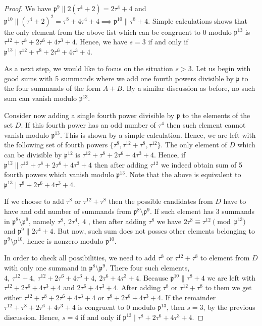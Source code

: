 \documentclass[12pt]{article}
\theoremstyle{remark}
\newcommand{\p}{\mathfrak{p}}
\begin{document}
\begin{proof}
We have $\mathfrak{p}^9 \parallel 2(\tau^4+2) = 2\tau^4+4$ and $\mathfrak{p}^{10} \parallel (\tau^4+2)^2 = \tau^8 + 4\tau^4 + 4 \implies \mathfrak{p}^{10} \parallel \tau^8+4 $. Simple calculations shows that the only element from the above list which can be congruent to 0 modulo $\mathfrak{p}^{13}$ is $\tau^{12}+\tau^8+2\tau^6+4\tau^3+4$. Hence, we have $s=3$ if and only if $\mathfrak{p}^{13} \mid \tau^{12}+\tau^8+2\tau^6+4\tau^3+4 $.

As a next step, we would like to focus on the situation $s>3$. Let us begin with good sums with 5 summands where we add one fourth powers divisible by $\mathfrak{p}$ to the four summands of the form $A+B$. By a similar discussion as before, no such sum can vanish modulo $\mathfrak{p}^{13}$.






 Consider now adding a single fourth power divisible by $\p$ to the elements of the set $D$. If this fourth power has an odd number of $\tau^4$ then such element cannot vanish modulo $\p^{13}$. This is shown by a simple calculation. Hence, we are left with the following set of fourth powers $\{\tau^8, \tau^{12}+\tau^8, \tau^{12}\}$. The only element of $D$ which can be divisible by $\p^{12}$ is $\tau^{12}+\tau^8+2\tau^6+4\tau^3+4$. Hence, if $\mathfrak{p}^{12} \parallel \tau^{12}+\tau^8+2\tau^6+4\tau^3+4$ then after adding $\tau^{12}$ we indeed obtain sum of 5 fourth powers which vanish modulo $\p^{13}$. Note that the above is equivalent to $\mathfrak{p}^{13} \mid \tau^8+2\tau^6+4\tau^3+4$.

 If we choose to add $\tau^8$ or $ \tau^{12}+\tau^8$ then the possible candidates from $D$ have to have and odd number of summands from $\p^8\setminus \p^9$. If such element has 3 summands in $\p^8\setminus \p^9$, namely $\tau^8, \ 2\tau^4, \ 4$ , then after adding $\tau^8$ we have $2\tau^8 \equiv \tau^{12} \pmod{\mathfrak{p}^{13}}$ and $\mathfrak{p}^9 \parallel 2\tau^4+4$. But now, such sum does not posses other elements belonging to $\p^9\setminus \p^{10}$, hence is nonzero modulo $\p^{10}$.

In order to check all possibilities, we need to add $\tau^8$ or $ \tau^{12}+\tau^8$ to element from $D$ with only one summand in $\p^8\setminus \p^9$. There four such elements, $4,\  \tau^{12}+4,\ \tau^{12}+2\tau^6+4\tau^3+4,\  2\tau^6+4\tau^3+4$. Because $\mathfrak{p}^{10} \parallel \tau^8+4$ we are left with $\tau^{12}+2\tau^6+4\tau^3+4$ and $2\tau^6+4\tau^3+4$. After adding $\tau^8$ or $\tau^{12}+\tau^8$  to them we get either $\tau^{12}+\tau^8+2\tau^6+4\tau^3+4$ or $\tau^8+2\tau^6+4\tau^3+4$. If the remainder $\tau^{12}+\tau^8+2\tau^6+4\tau^3+4$ is congruent to 0 modulo $\mathfrak{p}^{13}$, then $s=3$, by the previous discussion. Hence, $s=4$ if and only if $\mathfrak{p}^{13} \mid \tau^8+2\tau^6+4\tau^3+4 $.


\end{proof}
\end{document}
